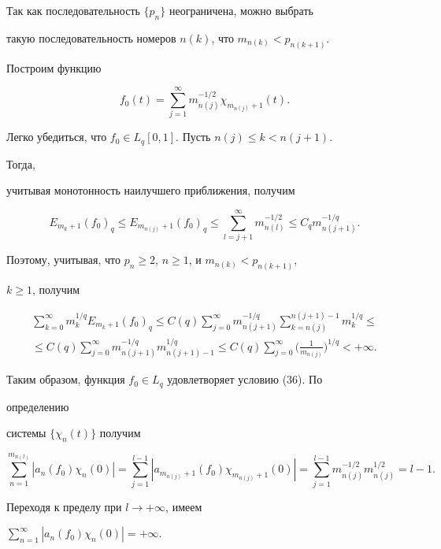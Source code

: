  


\begin{pf} 


Так как последовательность $\{p_n\}$ неограничена, можно выбрать 


такую последовательность номеров $n(k)$, что $m_{n(k)}<p_{n(k+1)}$. 


Построим функцию 


$$ 


f_0(t)=\sum^\infty_{j=1}m^{-1/2}_{n(j)}\chi_{m_{n(j)}+1}(t). 


$$ 


Легко убедиться, что $f_0\in L_q[0,1]$. Пусть $n(j)\le k<n(j+1)$. 


Тогда, 


учитывая монотонность наилучшего приближения, получим 


$$ 


E_{m_k+1}(f_0)_q\le E_{m_{n(j)}+1}(f_0)_q\le 


\sum^\infty_{l=j+1}m^{-1/2}_{n(l)}\le 


C_q m^{-1/q}_{n(j+1)}. 


$$ 


Поэтому, учитывая, что $p_n\ge2$, $n\ge1$, и $m_{n(k)}<p_{n(k+1)}$, 


$k\ge1$, получим 


\begin{multline*} 


\sum^\infty_{k=0}m^{1/q}_k E_{m_k+1}(f_0)_q\le C(q) 


\sum^\infty_{j=0}m^{-1/q}_{n(j+1)}\sum^{n(j+1)-1}_{k=n(j)} 


m^{1/q}_k \le \\ 


% 


\le C(q)\sum^\infty_{j=0}m^{-1/q}_{n(j+1)} 


m^{1/q}_{n(j+1)-1}\le C(q)\sum^\infty_{j=0} 


\bigg(\frac{1}{m_{n(j)}}\bigg)^{1/q}<+\infty. 


\end{multline*} 


Таким образом, функция $f_0\in L_q$ удовлетворяет условию (36). По 


определению 


системы $\{\chi_n(t)\}$ получим 


$$ 


\sum^{m_{n(l)}}_{n=1}|a_n(f_0)\chi_n(0)|= 


\sum^{l-1}_{j=1}|a_{m_{n(j)}+1}(f_0) 


\chi_{m_{n(j)}+1}(0)|= 


\sum^{l-1}_{j=1}m^{-1/2}_{n(j)}m^{1/2}_{n(j)}=l-1. 


$$ 


Переходя к пределу при $l\to+\infty$, имеем 


$\sum\limits^\infty_{n=1}|a_n(f_0)\chi_n(0)|=+\infty$. 


\end{pf} 


